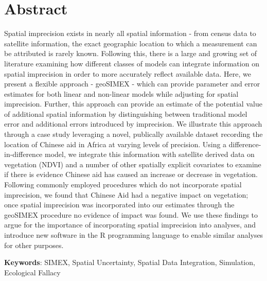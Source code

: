 \section{Abstract}
Spatial imprecision exists in nearly all spatial information - from census data to satellite information, the exact geographic location to which a measurement can be attributed is rarely known.
Following this, there is a large and growing set of literature examining how different classes of models can integrate information on spatial imprecision in order to more accurately reflect available data.
Here, we present a flexible approach - geoSIMEX - which can provide parameter and error estimates for both linear and non-linear models while adjusting for spatial imprecision.
Further, this approach can provide an estimate of the potential value of additional spatial information by distinguishing between traditional model error and additional errors introduced by imprecision.
We illustrate this approach through a case study leveraging a novel, publically available dataset recording the location of Chinese aid in Africa at varying levels of precision.
Using a difference-in-difference model, we integrate this information with satellite derived data on vegetation (NDVI) and a number of other spatially explicit covariates to examine if there is evidence Chinese aid has caused an increase or decrease in vegetation.
Following commonly employed procedures which do not incorporate spatial imprecision, we found that Chinese Aid had a negative impact on vegetation; once spatial imprecision was incorporated into our estimates through the geoSIMEX procedure no evidence of impact was found.
We use these findings to argue for the importance of incorporating spatial imprecision into analyses, and introduce new software in the R programming language to enable similar analyses for other purposes.

\textbf{Keywords}: SIMEX, Spatial Uncertainty, Spatial Data Integration, Simulation, Ecological Fallacy\\
\newpage

